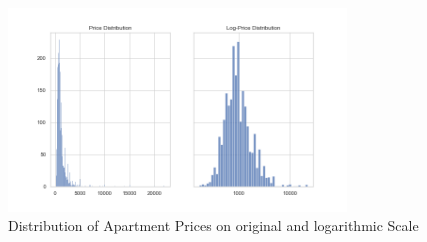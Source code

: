 \documentclass[12pt, letterpaper]{article}
\begin{document}
\begin{figure}[t]
    \centering
    \includegraphics[width=0.8\textwidth]{price_distribution.png}
    \caption{Distribution of Apartment Prices on original and logarithmic Scale}
    \label{fig:price-distribution}
\end{figure}
\end{document}
